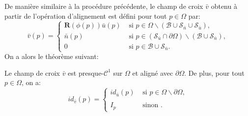 De manière similaire à la procédure précédente, le champ de croix $\bar{v}$ obtenu à partir de l'opération d'alignement est défini pour tout $p\in\Omega$ par:
\begin{equation}
\bar{v}(p)=
\left\{
\begin{array}{ll}
\mathbf{R}(\phi(p))\bar{u}(p) & \mbox{ si } p\in\Omega\backslash(\mathcal{B}\cup\mathcal{S}_{\bar{n}}\cup\mathcal{S}_{\bar{u}}),\\[0.5cm]
\bar{n}(p) & \mbox{ si } p\in(\mathcal{S}_{\bar{u}}\cap\partial\Omega)\backslash(\mathcal{B}\cup\mathcal{S}_{\bar{n}}),\\[0.5cm]
0 & \mbox{ si } p\in\mathcal{B}\cup\mathcal{S}_{\bar{n}}.
\end{array}
\right.
\end{equation}
On a alors le théorème suivant:
\begin{theorem}
\label{thm:theorem3}
Le champ de croix $\bar{v}$ est presque-$\mathcal{C}^1$ sur $\Omega$ et aligné avec $\partial\Omega$. De plus, pour tout $p\in\Omega$, on a:
\begin{equation}
id_{\bar{v}}(p)=
\left\{
\begin{array}{ll}
    id_{\bar{u}}(p) & \mbox{ si } p\in\Omega\backslash\partial\Omega,\\\\
    I_p & \mbox{ sinon }.
\end{array}
\right.
\end{equation}
\end{theorem}
